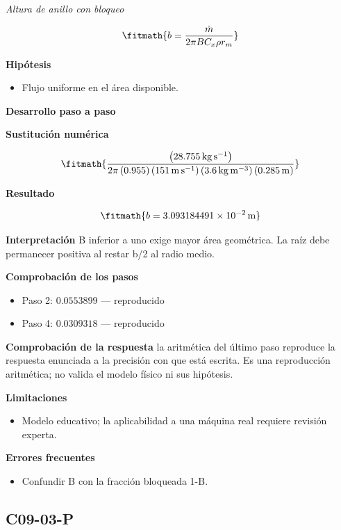 \documentclass[10pt,openany]{book}
\begin{document}
\noindent\textit{Altura de anillo con bloqueo}

\[
\fitmath{b=\frac{\dot m}{2 \pi B C_x \rho r_m}}
\]

\noindent\textbf{Hipótesis}
\begin{itemize}
\item Flujo uniforme en el área disponible.
\end{itemize}

\noindent\textbf{Desarrollo paso a paso}



\noindent\textbf{Sustitución numérica}

\[
\fitmath{\frac{\left(28.755\,\mathrm{kg}\,\mathrm{s}^{-1}\right)}{2 \pi \left(0.955\right) \left(151\,\mathrm{m}\,\mathrm{s}^{-1}\right) \left(3.6\,\mathrm{kg}\,\mathrm{m}^{-3}\right) \left(0.285\,\mathrm{m}\right)}}
\]

\noindent\textbf{Resultado}

\[
\fitmath{b=3.093184491\times10^{-2}\,\mathrm{m}}
\]

\noindent\textbf{Interpretación}
B inferior a uno exige mayor área geométrica. La raíz debe permanecer positiva al restar b/2 al radio medio.

\noindent\textbf{Comprobación de los pasos}
\begin{itemize}
\item Paso 2: $0.0553899$ — reproducido
\item Paso 4: $0.0309318$ — reproducido
\end{itemize}

\noindent\textbf{Comprobación de la respuesta} la aritmética del último paso reproduce la respuesta enunciada a la precisión con que está escrita. Es una reproducción aritmética; no valida el modelo físico ni sus hipótesis.

\noindent\textbf{Limitaciones}
\begin{itemize}
\item Modelo educativo; la aplicabilidad a una máquina real requiere revisión experta.
\end{itemize}

\noindent\textbf{Errores frecuentes}
\begin{itemize}
\item Confundir B con la fracción bloqueada 1-B.
\end{itemize}
\subsection*{C09-03-P}
\end{document}
